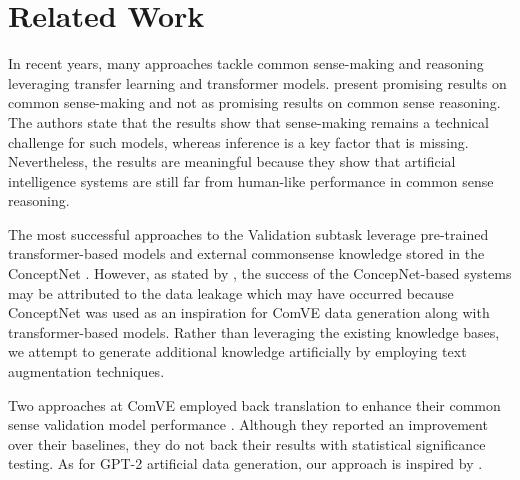 \documentclass[10pt, a4paper]{article}
\begin{document}
\section{Related Work}
\label{sec:rw}

In recent years, many approaches tackle common sense-making and reasoning leveraging transfer learning and transformer models. \citet{wang-etal-2019-make} present promising results on common sense-making and not as promising results on common sense reasoning. The authors state that the results show that sense-making remains a technical challenge for such models, whereas inference is a key factor that is missing. Nevertheless, the results are meaningful because they show that artificial intelligence systems are still far from human-like performance in common sense reasoning.

The most successful approaches to the Validation subtask \citep{zhang-etal-2020-cn,zhao-etal-2020-ecnu} leverage pre-trained transformer-based models and external commonsense knowledge stored in the ConceptNet \cite{conceptnet}. However, as stated by \citet{wang-etal-2020-semeval}, the success of the ConcepNet-based systems may be attributed to the data leakage which may have occurred because ConceptNet was used as an inspiration for ComVE data generation along with transformer-based models. Rather than leveraging the existing knowledge bases, we attempt to generate additional knowledge artificially by employing text augmentation techniques.

Two approaches at ComVE employed back translation to enhance their common sense validation model performance \citep{liu-etal-2020-lmve,jon-etal-2020-fit}. Although they reported an improvement over their baselines, they do not back their results with statistical significance testing. As for GPT-2 artificial data generation, our approach is inspired by \citet{kumar-etal-2020-data}.
\end{document}
